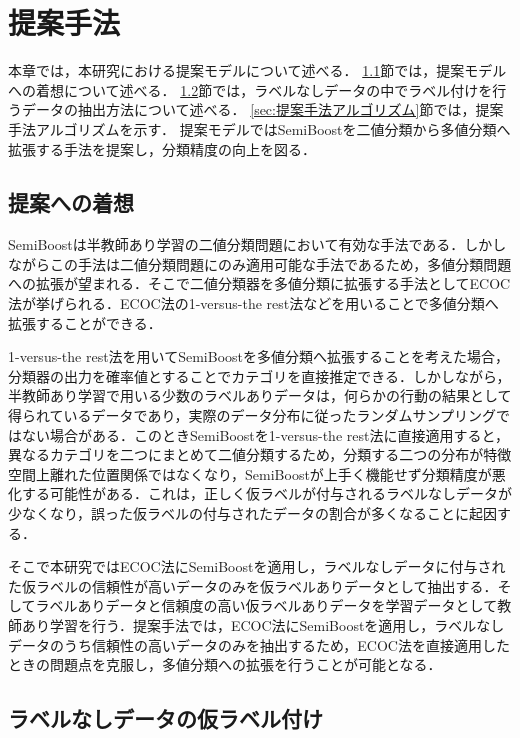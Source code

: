 \chapter{提案手法}

本章では，本研究における提案モデルについて述べる．
\ref{sec:提案への着想}節では，提案モデルへの着想について述べる．
\ref{sec:ラベル付け}節では，ラベルなしデータの中でラベル付けを行うデータの抽出方法について述べる．
\ref{sec:提案手法アルゴリズム}節では，提案手法アルゴリズムを示す．
提案モデルではSemiBoostを二値分類から多値分類へ拡張する手法を提案し，分類精度の向上を図る．
\section{提案への着想}
\label{sec:提案への着想}
SemiBoostは半教師あり学習の二値分類問題において有効な手法である．しかしながらこの手法は二値分類問題にのみ適用可能な手法であるため，多値分類問題への拡張が望まれる．そこで二値分類器を多値分類に拡張する手法としてECOC法が挙げられる．ECOC法の1-versus-the rest法などを用いることで多値分類へ拡張することができる．\par

1-versus-the rest法を用いてSemiBoostを多値分類へ拡張することを考えた場合，分類器の出力を確率値とすることでカテゴリを直接推定できる．しかしながら，半教師あり学習で用いる少数のラベルありデータは，何らかの行動の結果として得られているデータであり，実際のデータ分布に従ったランダムサンプリングではない場合がある．このときSemiBoostを1-versus-the rest法に直接適用すると，異なるカテゴリを二つにまとめて二値分類するため，分類する二つの分布が特徴空間上離れた位置関係ではなくなり，SemiBoostが上手く機能せず分類精度が悪化する可能性がある．これは，正しく仮ラベルが付与されるラベルなしデータが少なくなり，誤った仮ラベルの付与されたデータの割合が多くなることに起因する．\par
\newpage
そこで本研究ではECOC法にSemiBoostを適用し，ラベルなしデータに付与された仮ラベルの信頼性が高いデータのみを仮ラベルありデータとして抽出する．そしてラベルありデータと信頼度の高い仮ラベルありデータを学習データとして教師あり学習を行う．提案手法では，ECOC法にSemiBoostを適用し，ラベルなしデータのうち信頼性の高いデータのみを抽出するため，ECOC法を直接適用したときの問題点を克服し，多値分類への拡張を行うことが可能となる．\par


\section{ラベルなしデータの仮ラベル付け}
\label{sec:ラベル付け}


